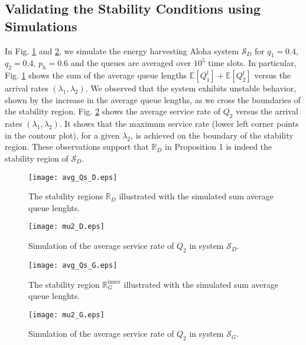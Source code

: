 \documentclass[draftcls,12pt,onecolumn]{IEEEtran}
\begin{document}
\subsection{Validating the Stability Conditions using Simulations} \label{subsec: valid}
In Fig. \ref{fig: eval avg_Qs D} and \ref{fig: eval mu2 D}, we simulate the energy harvesting Aloha system $ \mathcal{S}_D$ for $q_1\!=\!0.4$, $q_2\!=\!0.4 $, $p_h\!=\!0.6 $ and the queues are averaged over $10^5$ time slots. In particular, Fig. \ref{fig: eval avg_Qs D} shows the sum of the average queue lengths $ \mathbb{E}[Q_1^t] \!+\! \mathbb{E}[Q_2^t]$ versus the arrival rates $(\lambda_1,\lambda_2)$. We observed that the system exhibits unstable behavior, shown by the increase in the average queue lengths, as we cross the boundaries of the stability region. Fig. \ref{fig: eval mu2 D} shows the  average service rate of $Q_2$ versus the arrival rates $(\lambda_1,\lambda_2)$. It shows that the maximum service rate (lower left corner points in the contour plot), for a given $\lambda_2$, is achieved on the boundary of the stability region. These observations support that $\mathbb{R}_D$ in Proposition 1 is indeed the stability region of $ \mathcal{S}_D$.\\ \begin{figure}[t]
\texttt{[image: avg\_Qs\_D.eps]} 
\centering
\caption{The stability regions $\mathbb{R}_D$ illustrated with the simulated sum average queue lenghts. }\label{fig: eval avg_Qs D}
\end{figure}
\begin{figure}[h]
\texttt{[image: mu2\_D.eps]} 
\centering
\caption{Simulation of the average service rate of $Q_2$ in system $\mathcal{S}_D$.}\label{fig: eval mu2 D}
\end{figure}
\begin{figure}[t]
\texttt{[image: avg\_Qs\_G.eps]} 
\centering
\caption{The stability region $\mathbb{R}_G^{\text{inner}}$ illustrated with the simulated sum average queue lenghts. }\label{fig: eval avg_Qs G}
\end{figure}
\begin{figure}
\texttt{[image: mu2\_G.eps]} 
\centering
\caption{Simulation of the average service rate of $Q_2$ in system $\mathcal{S}_G$.}\label{fig: eval mu2 G}
\end{figure}
\end{document}
